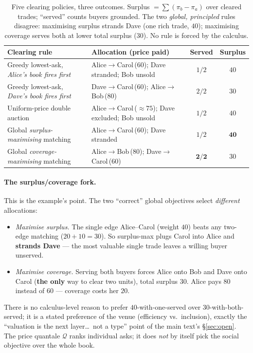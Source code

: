\documentclass[11pt]{article}
\theoremstyle{definition}
\newcommand{\Qval}{\mathcal{Q}}            %
\begin{document}
\begin{table}[h]
\centering\small
\renewcommand{\arraystretch}{1.25}
\begin{tabular}{@{}p{4.7cm}p{4.2cm}cc@{}}
\toprule
\textbf{Clearing rule} & \textbf{Allocation (price paid)} & \textbf{Served} & \textbf{Surplus} \\
\midrule
Greedy lowest-ask, \emph{Alice's book fires first} &
  Alice$\to$Carol\,(60); Dave stranded; Bob unsold & $1/2$ & $40$ \\
Greedy lowest-ask, \emph{Dave's book fires first} &
  Dave$\to$Carol\,(60); Alice$\to$Bob\,(80) & $2/2$ & $30$ \\
Uniform-price double auction &
  Alice$\to$Carol\,($\approx75$); Dave excluded; Bob unsold & $1/2$ & $40$ \\
Global \emph{surplus-maximising} matching &
  Alice$\to$Carol\,(60); Dave stranded & $1/2$ & $\mathbf{40}$ \\
Global \emph{coverage-maximising} matching &
  Alice$\to$Bob\,(80); Dave$\to$Carol\,(60) & $\mathbf{2/2}$ & $30$ \\
\bottomrule
\end{tabular}
\caption{Five clearing policies, three outcomes. Surplus $=\sum(\pi_b-\pi_a)$ over cleared trades;
``served'' counts buyers grounded. The two \emph{global, principled} rules disagree: maximising
surplus strands Dave (one rich trade, $40$); maximising coverage serves both at lower total surplus
($30$). No rule is forced by the calculus.}
\label{tab:outcomes}
\end{table}

\paragraph{The surplus/coverage fork.} This is the example's point. The two ``correct'' global
objectives select \emph{different} allocations:
\begin{itemize}[leftmargin=1.4em]
\item \emph{Maximise surplus.} The single edge Alice--Carol (weight $40$) beats any two-edge matching
($20{+}10=30$). So surplus-max plugs Carol into Alice and \textbf{strands Dave} --- the most valuable
single trade leaves a willing buyer unserved.
\item \emph{Maximise coverage.} Serving both buyers forces Alice onto Bob and Dave onto Carol
(\textbf{the only} way to clear two units), total surplus $30$. Alice pays $80$ instead of $60$ ---
coverage costs her $20$.
\end{itemize}
There is no calculus-level reason to prefer $40$-with-one-served over $30$-with-both-served; it is a
stated preference of the venue (efficiency vs.\ inclusion), exactly the ``valuation is the next
layer\ldots\ not a type'' point of the main text's \S\ref{sec:open}. The price quantale $\Qval$ ranks individual
asks; it does \emph{not} by itself pick the social objective over the whole book.
\end{document}
